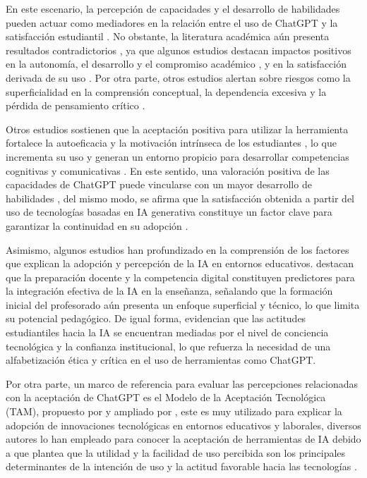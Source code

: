 \documentclass[spanish]{textolivre}
\begin{document}
En este escenario, la percepción de capacidades y el desarrollo de habilidades pueden actuar como mediadores en la relación entre el uso de ChatGPT y la satisfacción estudiantil \cite{alshwiah2024, conglem2025}. No obstante, la literatura académica aún presenta resultados contradictorios \cite{chellappa2024}, ya que algunos estudios destacan impactos positivos en la autonomía, el desarrollo y el compromiso académico \cite{alsofyani2025, shuhaiber2025}, y en la satisfacción derivada de su uso \cite{rehman2024}. Por otra parte, otros estudios alertan sobre riesgos como la superficialidad en la comprensión conceptual, la dependencia excesiva y la pérdida de pensamiento crítico \cite{dahri2025a, monib2025, yankouskaya2025}.

Otros estudios sostienen que la aceptación positiva para utilizar la herramienta fortalece la autoeficacia y la motivación intrínseca de los estudiantes \cite{almamary2024, almulla2024, almamary2025}, lo que incrementa su uso y generan un entorno propicio para desarrollar competencias cognitivas y comunicativas \cite{ma2025, kim2025}. En este sentido, una valoración positiva de las capacidades de ChatGPT puede vincularse con un mayor desarrollo de habilidades \cite{almogren2024, shah2024}, del mismo modo, se afirma que la satisfacción obtenida a partir del uso de tecnologías basadas en IA generativa constituye un factor clave para garantizar la continuidad en su adopción \cite{xing2024, chang2025}.

Asimismo, algunos estudios han profundizado en la comprensión de los factores que explican la adopción y percepción de la IA en entornos educativos. \textcite{lucas2025} destacan que la preparación docente y la competencia digital constituyen predictores para la integración efectiva de la IA en la enseñanza, señalando que la formación inicial del profesorado aún presenta un enfoque superficial y técnico, lo que limita su potencial pedagógico. De igual forma, \textcite{arroyosagasta2025} evidencian que las actitudes estudiantiles hacia la IA se encuentran mediadas por el nivel de conciencia tecnológica y la confianza institucional, lo que refuerza la necesidad de una alfabetización ética y crítica en el uso de herramientas como ChatGPT.

Por otra parte, un marco de referencia para evaluar las percepciones relacionadas con la aceptación de ChatGPT es el Modelo de la Aceptación Tecnológica (TAM), propuesto por \textcite{davis1989} y ampliado por \textcite{chau1996}, este es muy utilizado para explicar la adopción de innovaciones tecnológicas en entornos educativos y laborales, diversos autores lo han empleado para conocer la aceptación de herramientas de IA \cite{montag2025, yudhistyra2025} debido a que plantea que la utilidad y la facilidad de uso percibida son los principales determinantes de la intención de uso y la actitud favorable hacia las tecnologías \cite{saif2024}. 
\end{document}
